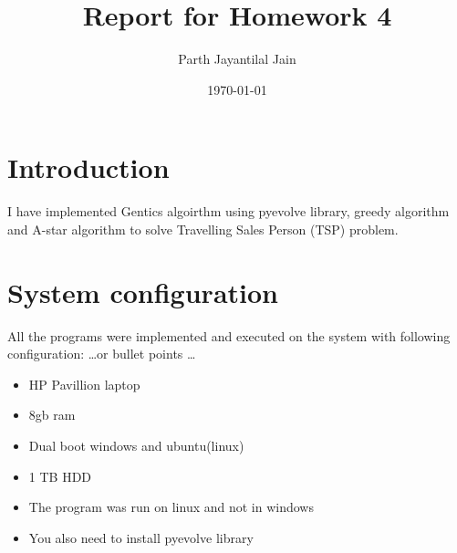 \documentclass[a4paper]{article}
\title{Report for Homework 4}
\author{Parth Jayantilal Jain}
\date{\today}
\begin{document}
\maketitle

\section{Introduction}
\label{sec:introduction}
I have implemented Gentics algoirthm using pyevolve library, greedy algorithm and A-star algorithm to solve Travelling Sales Person (TSP) problem. 

\section{System configuration}
\label{sec:systemconfiguration}
All the programs were implemented and executed on the system with following configuration:
\dots or bullet points \dots
\begin{itemize}
\item HP Pavillion laptop
\item 8gb ram
\item Dual boot windows and ubuntu(linux)
\item 1 TB HDD
\item The program was run on linux and not in 
windows
\item You also need to install pyevolve library
\end{itemize}
\end{document}
